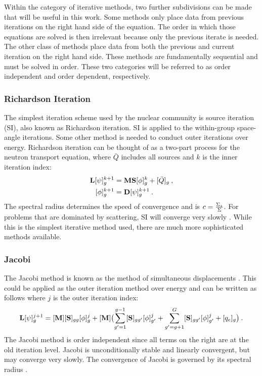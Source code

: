 Within the category of iterative methods, two further subdivisions can be made that will be useful in this work. Some methods only place data from previous iterations on the right hand side of the equation. The order in which those equations are solved is then irrelevant because only the previous iterate is needed. The other class of methods place data from both the previous and current iteration on the right hand side. These methods are fundamentally sequential and must be solved in order. These two categories will be referred to as order independent and order dependent, respectively. 

\subsubsection{Richardson Iteration}
The simplest iteration scheme used by the nuclear community is source iteration (SI), also known as Richardson iteration. SI is applied to the within-group space-angle iterations. Some other method is needed to conduct outer iterations over energy. Richardson iteration can be thought of as a two-part process for the neutron transport equation, where $\bar{Q}$ includes all sources and $k$ is the inner iteration index:
%
\begin{align}
  \mathbf{L}[\psi]_g^{k+1} &= \mathbf{MS} [\phi]_g^k + [\bar{Q}]_{g} \:,   \label{eq:SIpsi} \\
  [\phi]_g^{k+1} &= \mathbf{D}[\psi]_g^{k+1} \:.
  \label{eq:SIphi}
\end{align}
%
The spectral radius determines the speed of convergence and is $c = \frac{\Sigma_s}{\Sigma}$. For problems that are dominated by scattering, SI will converge very slowly \cite{Evans2009d}. While this is the simplest iterative method used, there are much more sophisticated methods available. 

\subsubsection{Jacobi}
The Jacobi method is known as the method of simultaneous displacements \cite{LeVeque2007}. This could be applied as the outer iteration method over energy and can be written as follows where $j$ is the outer iteration index:
%
\begin{equation}
  \mathbf{L} [\psi]_{g}^{j+1} = [\mathbf{M}] [\mathbf{S}]_{gg}[\phi]_{g}^{j} +   [\mathbf{M}]\bigl(\sum_{g'=1}^{g-1} [\mathbf{S}]_{gg'}[\phi]_{g'}^{j} + \sum_{g'=g+1}^{G} [\mathbf{S}]_{gg'}[\phi]_{g'}^{j} + [q_{e}]_{g} \bigr) \label{eq:Jacobi} \:. 
\end{equation}
%
The Jacobi method is order independent since all terms on the right are at the old iteration level. Jacobi is unconditionally stable and linearly convergent, but may converge very slowly. The convergence of Jacobi is governed by its spectral radius \cite{LeVeque2007}. 

